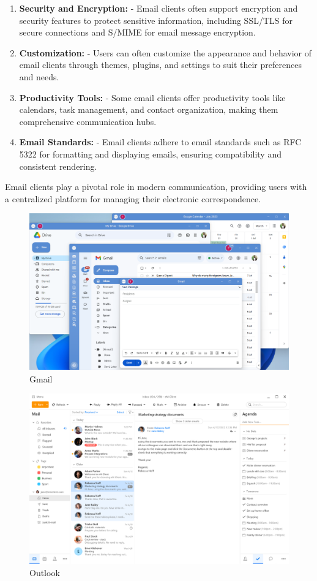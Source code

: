 \documentclass[11pt]{article}
\begin{document}
\begin{enumerate}
    \item \textbf{Security and Encryption:}
          - Email clients often support encryption and security features to protect sensitive information, including SSL/TLS for secure connections and S/MIME for email message encryption.

    \item \textbf{Customization:}
          - Users can often customize the appearance and behavior of email clients through themes, plugins, and settings to suit their preferences and needs.

    \item \textbf{Productivity Tools:}
          - Some email clients offer productivity tools like calendars, task management, and contact organization, making them comprehensive communication hubs.

    \item \textbf{Email Standards:}
          - Email clients adhere to email standards such as RFC 5322 for formatting and displaying emails, ensuring compatibility and consistent rendering.

\end{enumerate}

Email clients play a pivotal role in modern communication, providing users with a centralized platform for managing their electronic correspondence.

\begin{figure}[H]
    \centering
    \includegraphics[width=.75\textwidth]{./emailclients/email clients_3.jpg}
    \caption{Gmail}
\end{figure}

\begin{figure}[H]
    \centering
    \includegraphics[width=.75\textwidth]{./emailclients/email clients_7.jpg}
    \caption{Outlook}
\end{figure}
\end{document}
